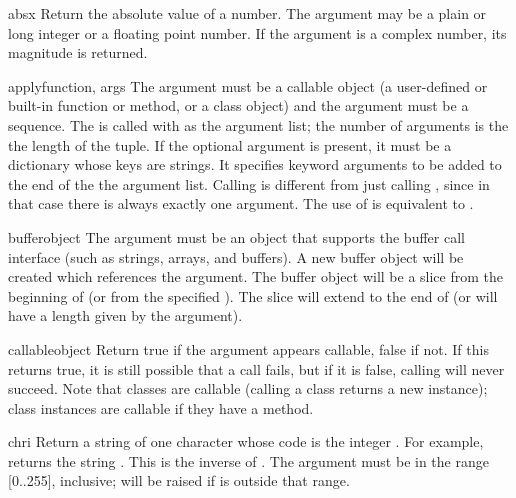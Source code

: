\begin{funcdesc}{abs}{x}
  Return the absolute value of a number.  The argument may be a plain
  or long integer or a floating point number.  If the argument is a
  complex number, its magnitude is returned.
\end{funcdesc}

\begin{funcdesc}{apply}{function, args}
  The  argument must be a callable object (a
  user-defined or built-in function or method, or a class object) and
  the  argument must be a sequence.  The  is
  called with  as the argument list; the number of arguments
  is the the length of the tuple.
  If the optional  argument is present, it must be a
  dictionary whose keys are strings.  It specifies keyword arguments
  to be added to the end of the the argument list.
  Calling  is different from just calling
  , since in that case there is always
  exactly one argument.  The use of  is equivalent
  to .
\end{funcdesc}

\begin{funcdesc}{buffer}{object}
  The  argument must be an object that supports the buffer
  call interface (such as strings, arrays, and buffers).  A new buffer
  object will be created which references the  argument.
  The buffer object will be a slice from the beginning of 
  (or from the specified ). The slice will extend to the
  end of  (or will have a length given by the 
  argument).
\end{funcdesc}

\begin{funcdesc}{callable}{object}
  Return true if the  argument appears callable, false if
  not.  If this returns true, it is still possible that a call fails,
  but if it is false, calling  will never succeed.  Note
  that classes are callable (calling a class returns a new instance);
  class instances are callable if they have a 
  method.
\end{funcdesc}

\begin{funcdesc}{chr}{i}
  Return a string of one character whose \ASCII{} code is the integer
  .  For example,  returns the string .
  This is the inverse of .  The argument must be in
  the range [0..255], inclusive;  will be raised
  if  is outside that range.
\end{funcdesc}

